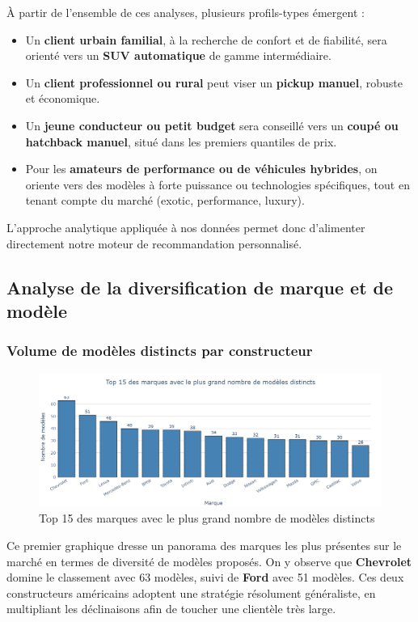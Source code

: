 \documentclass[12pt]{report}
\begin{document}
À partir de l’ensemble de ces analyses, plusieurs profils-types émergent :
\begin{itemize}
  \item Un \textbf{client urbain familial}, à la recherche de confort et de fiabilité, sera orienté vers un \textbf{SUV automatique} de gamme intermédiaire.
  \item Un \textbf{client professionnel ou rural} peut viser un \textbf{pickup manuel}, robuste et économique.
  \item Un \textbf{jeune conducteur ou petit budget} sera conseillé vers un \textbf{coupé ou hatchback manuel}, situé dans les premiers quantiles de prix.
  \item Pour les \textbf{amateurs de performance ou de véhicules hybrides}, on oriente vers des modèles à forte puissance ou technologies spécifiques, tout en tenant compte du marché (exotic, performance, luxury).
\end{itemize}

L’approche analytique appliquée à nos données permet donc d’alimenter directement notre moteur de recommandation personnalisé.


\subsection{Analyse de la diversification de marque et de modèle}

\subsubsection{Volume de modèles distincts par constructeur}

\begin{figure}[H]
    \centering
    \includegraphics[width=1\textwidth]{Modele_marque.png}
    \caption{Top 15 des marques avec le plus grand nombre de modèles distincts}
    \label{fig:modele-marque}
\end{figure}

Ce premier graphique dresse un panorama des marques les plus présentes sur le marché en termes de diversité de modèles proposés. On y observe que \textbf{Chevrolet} domine le classement avec 63 modèles, suivi de \textbf{Ford} avec 51 modèles. Ces deux constructeurs américains adoptent une stratégie résolument généraliste, en multipliant les déclinaisons afin de toucher une clientèle très large.
\end{document}
